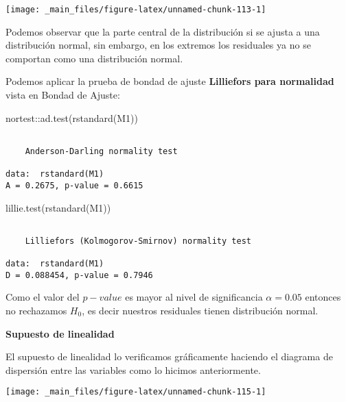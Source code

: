 \documentclass[
  a4paper,
  oneside,
  openany]{book}
\newenvironment{Shaded}{\begin{snugshade}}{\end{snugshade}}
\newcommand{\FunctionTok}[1]{\textcolor[rgb]{0.00,0.00,0.00}{#1}}
\newcommand{\NormalTok}[1]{#1}
\newcommand{\SpecialCharTok}[1]{\textcolor[rgb]{0.00,0.00,0.00}{#1}}
\begin{document}
\begin{center}\texttt{[image: \_main\_files/figure-latex/unnamed-chunk-113-1]} \end{center}

Podemos observar que la parte central de la distribución si se ajusta a una distribución normal, sin embargo, en los extremos los residuales ya no se comportan como una distribución normal.

Podemos aplicar la prueba de bondad de ajuste \textbf{Lilliefors para normalidad} vista en Bondad de Ajuste:

\begin{Shaded}
\begin{Highlighting}[]
\NormalTok{nortest}\SpecialCharTok{::}\FunctionTok{ad.test}\NormalTok{(}\FunctionTok{rstandard}\NormalTok{(M1))}
\end{Highlighting}
\end{Shaded}

\begin{verbatim}

    Anderson-Darling normality test

data:  rstandard(M1)
A = 0.2675, p-value = 0.6615
\end{verbatim}

\begin{Shaded}
\begin{Highlighting}[]
\FunctionTok{lillie.test}\NormalTok{(}\FunctionTok{rstandard}\NormalTok{(M1))}
\end{Highlighting}
\end{Shaded}

\begin{verbatim}

    Lilliefors (Kolmogorov-Smirnov) normality test

data:  rstandard(M1)
D = 0.088454, p-value = 0.7946
\end{verbatim}

Como el valor del \(p-value\) es mayor al nivel de significancia \(\alpha=0.05\) entonces no rechazamos \(H_{0}\), es decir nuestros residuales tienen distribución normal.

\textbf{Supuesto de linealidad}

El supuesto de linealidad lo verificamos gráficamente haciendo el diagrama de dispersión entre las variables como lo hicimos anteriormente.

\begin{center}\texttt{[image: \_main\_files/figure-latex/unnamed-chunk-115-1]} \end{center}
\end{document}
